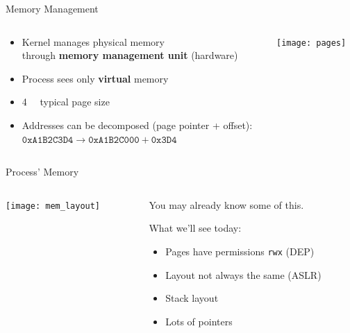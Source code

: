 \documentclass[beamer]{uibk}
\begin{document}
\begin{frame}{Memory Management}
    \begin{columns}
        \begin{column}{0.5\textwidth}
            \begin{itemize}
                \item Kernel manages physical memory\\
                    through \textbf{memory management unit} (hardware)
                \medskip
                \item Process sees only \textbf{virtual} memory
                \medskip
                \item \SI{4}{\kibi\byte} typical page size
                \medskip
                \item Addresses can be decomposed (page pointer + offset):\\
                    \smallskip
                    $\mathtt{0xA1B2C3D4} \to \texttt{0xA1B2C000} + \mathtt{0x3D4}$
            \end{itemize}
        \end{column}
        \begin{column}{0.5\textwidth}
            \texttt{[image: pages]}
        \end{column}
    \end{columns}
\end{frame}

\begin{frame}{Process' Memory}
    \begin{columns}
        \begin{column}{0.5\textwidth}
            \begin{center}
                \texttt{[image: mem\_layout]}
            \end{center}
        \end{column}
        \begin{column}{0.5\textwidth}
            You may already know some of this.
            \bigskip

            What we'll see today:
            \begin{itemize}
                \item Pages have permissions \texttt{rwx} (DEP)
                \item Layout not always the same (ASLR)
                \item Stack layout
                \item Lots of pointers
            \end{itemize}
        \end{column}
    \end{columns}
\end{frame}
\end{document}

